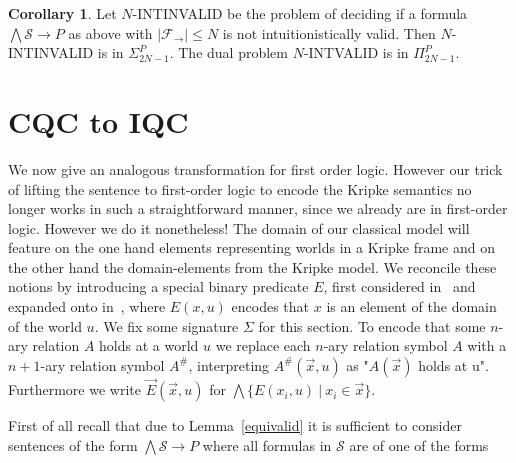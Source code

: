 \documentclass[a4paper,12pt]{report}
\theoremstyle{definition}
\theoremstyle{definition}
\newtheorem{corollary}[theorem]{Corollary}
\theoremstyle{definition}
\theoremstyle{definition}
\theoremstyle{definition}
\theoremstyle{definition}
\theoremstyle{definition}
\begin{document}
	\begin{corollary}
		Let $N$-INTINVALID be the problem of deciding if a formula $\bigwedge \mathcal S\to P$ as above with $|\mathcal F_\to|\leq N$ is not intuitionistically valid. Then $N$-INTINVALID is in $\Sigma_{2N-1}^P$. The dual problem $N$-INTVALID is in $\Pi_{2N-1}^P$.
	\end{corollary}
	
	\section{CQC to IQC}
	
	We now give an analogous transformation for first order logic. However our trick of lifting the sentence to first-order logic to encode the Kripke semantics no longer works in such a straightforward manner, since we already are in first-order logic. However we do it nonetheless! The domain of our classical model will feature on the one hand elements representing worlds in a Kripke frame and on the other hand the domain-elements from the Kripke model. We reconcile these notions by introducing a special binary predicate $E$, first considered in~\cite{baaz2006skolemization} and expanded onto in~\cite{iemhoff2010eskolemization}, where $E(x, u)$ encodes that $x$ is an element of the domain of the world $u$. We fix some signature $\Sigma$ for this section. To encode that some $n$-ary relation $A$ holds at a world $u$ we replace each $n$-ary relation symbol $A$ with a $n+1$-ary relation symbol $A^\#$, interpreting $A^\#(\vec x, u)$ as "$A(\vec x)$ holds at u". Furthermore we write $\vec E(\vec x, u)$ for $\bigwedge\{E(x_i, u)\:|\:x_i\in \vec x\}$. 
	
	First of all recall that due to Lemma~\ref{equivalid} it is sufficient to consider sentences of the form $\bigwedge\mathcal S\to P$ where all formulas in $\mathcal S$ are of one of the forms
	
\end{document}
